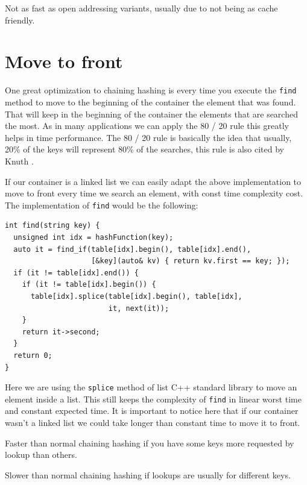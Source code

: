 \rightthumbsdown Not as fast as open addressing variants, usually due to not being as cache friendly.



\section{Move to front}

One great optimization to chaining hashing is every time you execute the \texttt{find} method to move to the beginning of the container the element that was found. That will keep in the beginning of the container the elements that are searched the most. As in many applications we can apply the 80 / 20 rule this greatly helps in time performance. The 80 / 20 rule is basically the idea that usually, 20\% of the keys will represent 80\% of the searches, this rule is also cited by Knuth \citep{TAOCP3}.

If our container is a linked list we can easily adapt the above implementation to move to front every time we search an element, with const time complexity cost. The implementation of \texttt{find} would be the following:

\begin{lstlisting}
int find(string key) {
  unsigned int idx = hashFunction(key);
  auto it = find_if(table[idx].begin(), table[idx].end(),
                    [&key](auto& kv) { return kv.first == key; });
  if (it != table[idx].end()) {
    if (it != table[idx].begin()) {
      table[idx].splice(table[idx].begin(), table[idx],
                        it, next(it));
    }
    return it->second;
  }
  return 0;
}
\end{lstlisting}

Here we are using the \texttt{splice} method of list C++ standard library to move an element inside a list. This still keeps the complexity of \texttt{find} in linear worst time and constant expected time. It is important to notice here that if our container wasn't a linked list we could take longer than constant time to move it to front.

\rightthumbsup Faster than normal chaining hashing if you have some keys more requested by lookup than others.

\rightthumbsdown Slower than normal chaining hashing if lookups are usually for different keys.

